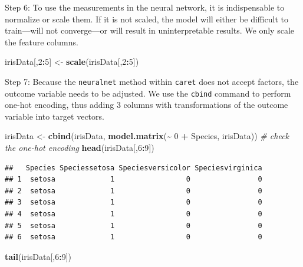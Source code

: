 \documentclass[
]{article}
\newenvironment{Shaded}{\begin{snugshade}}{\end{snugshade}}
\newcommand{\CommentTok}[1]{\textcolor[rgb]{0.56,0.35,0.01}{\textit{#1}}}
\newcommand{\DecValTok}[1]{\textcolor[rgb]{0.00,0.00,0.81}{#1}}
\newcommand{\FunctionTok}[1]{\textcolor[rgb]{0.13,0.29,0.53}{\textbf{#1}}}
\newcommand{\NormalTok}[1]{#1}
\newcommand{\OtherTok}[1]{\textcolor[rgb]{0.56,0.35,0.01}{#1}}
\newcommand{\SpecialCharTok}[1]{\textcolor[rgb]{0.81,0.36,0.00}{\textbf{#1}}}
\begin{document}
Step 6: To use the measurements in the neural network, it is
indispensable to normalize or scale them. If it is not scaled, the model
will either be difficult to train---will not converge---or will result
in uninterpretable results. We only scale the feature columns.

\begin{Shaded}
\begin{Highlighting}[]
\NormalTok{irisData[,}\DecValTok{2}\SpecialCharTok{:}\DecValTok{5}\NormalTok{] }\OtherTok{\textless{}{-}} \FunctionTok{scale}\NormalTok{(irisData[,}\DecValTok{2}\SpecialCharTok{:}\DecValTok{5}\NormalTok{])}
\end{Highlighting}
\end{Shaded}

Step 7: Because the \texttt{neuralnet} method within \texttt{caret} does
not accept factors, the outcome variable needs to be adjusted. We use
the \texttt{cbind} command to perform one-hot encoding, thus adding 3
columns with transformations of the outcome variable into target
vectors.

\begin{Shaded}
\begin{Highlighting}[]
\NormalTok{irisData }\OtherTok{\textless{}{-}} \FunctionTok{cbind}\NormalTok{(irisData, }\FunctionTok{model.matrix}\NormalTok{(}\SpecialCharTok{\textasciitilde{}} \DecValTok{0} \SpecialCharTok{+}\NormalTok{ Species, irisData))}
\CommentTok{\# check the one{-}hot encoding}
\FunctionTok{head}\NormalTok{(irisData[,}\DecValTok{6}\SpecialCharTok{:}\DecValTok{9}\NormalTok{])}
\end{Highlighting}
\end{Shaded}

\begin{verbatim}
##   Species Speciessetosa Speciesversicolor Speciesvirginica
## 1  setosa             1                 0                0
## 2  setosa             1                 0                0
## 3  setosa             1                 0                0
## 4  setosa             1                 0                0
## 5  setosa             1                 0                0
## 6  setosa             1                 0                0
\end{verbatim}

\begin{Shaded}
\begin{Highlighting}[]
\FunctionTok{tail}\NormalTok{(irisData[,}\DecValTok{6}\SpecialCharTok{:}\DecValTok{9}\NormalTok{])}
\end{Highlighting}
\end{Shaded}
\end{document}

